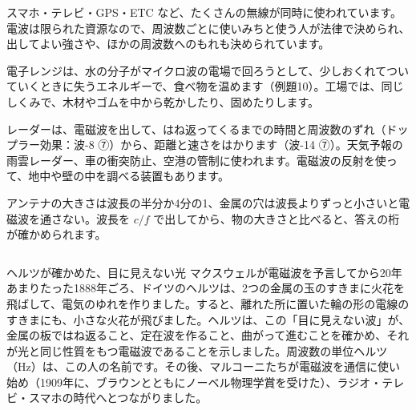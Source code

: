 \begin{phkougaku}
スマホ・テレビ・GPS・ETC など、たくさんの無線が同時に使われています。電波は限られた資源なので、周波数ごとに使いみちと使う人が法律で決められ、出してよい強さや、ほかの周波数へのもれも決められています。

電子レンジは、水の分子がマイクロ波の電場で回ろうとして、少しおくれてついていくときに失うエネルギーで、食べ物を温めます（例題10）。工場では、同じしくみで、木材やゴムを中から乾かしたり、固めたりします。

レーダーは、電磁波を出して、はね返ってくるまでの時間と周波数のずれ（ドップラー効果：波-8 ⑦）から、距離と速さをはかります（波-14 ⑦）。天気予報の雨雲レーダー、車の衝突防止、空港の管制に使われます。電磁波の反射を使って、地中や壁の中を調べる装置もあります。

\begin{phketa}[電磁波の数]
アンテナの大きさは波長の半分か4分の1、金属の穴は波長よりずっと小さいと電磁波を通さない。波長を $c/f$ で出してから、物の大きさと比べると、答えの桁が確かめられます。
\end{phketa}
\end{phkougaku}

\begin{column}{ヘルツが確かめた、目に見えない光}
マクスウェルが電磁波を予言してから20年あまりたった1888年ごろ、ドイツのヘルツは、2つの金属の玉のすきまに火花を飛ばして、電気のゆれを作りました。すると、離れた所に置いた輪の形の電線のすきまにも、小さな火花が飛びました。ヘルツは、この「目に見えない波」が、金属の板ではね返ること、定在波を作ること、曲がって進むことを確かめ、それが光と同じ性質をもつ電磁波であることを示しました。周波数の単位ヘルツ（Hz）は、この人の名前です。その後、マルコーニたちが電磁波を通信に使い始め（1909年に、ブラウンとともにノーベル物理学賞を受けた）、ラジオ・テレビ・スマホの時代へとつながりました。
\end{column}

